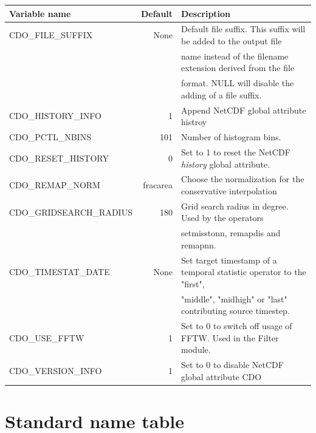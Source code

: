 \begin{tabular}[t]{|>{\columncolor{pcolor1}}l|r|l|}
\hline
\rowcolor{pcolor2}
\textbf{Variable name}           &  \textbf{Default} & \textbf{Description} \\ \hline
CDO\_FILE\_SUFFIX             &   None   &  Default file suffix. This suffix will be added to the output file \\
                                           &               &  name instead of the filename extension derived from the file \\
                                           &               & format. NULL will disable the adding of a file suffix. \\ \hline
CDO\_HISTORY\_INFO        &         1   & Append NetCDF global attribute histroy \\ \hline
CDO\_PCTL\_NBINS            &     101    & Number of histogram bins. \\ \hline
CDO\_RESET\_HISTORY       &         0  & Set to 1 to reset the NetCDF \textit{history} global attribute.\\ \hline
CDO\_REMAP\_NORM         &  fracarea & Choose the normalization for the conservative interpolation \\ \hline
CDO\_GRIDSEARCH\_RADIUS       &  180       & Grid search radius in degree. Used by the operators \\
                                                     &        & setmisstonn, remapdis and remapnn. \\ \hline
CDO\_TIMESTAT\_DATE     &  None   & Set target timestamp of a temporal statistic operator to the "first",  \\
                                           &             & "middle", "midhigh" or "last" contributing  source timestep.\\ \hline
CDO\_USE\_FFTW               &         1  & Set to 0 to switch off usage of FFTW. Used in the Filter module.\\ \hline
CDO\_VERSION\_INFO        &         1  & Set to 0 to disable NetCDF global attribute CDO \\ \hline
\end{tabular}





\chapter{\label{stdnametable}Standard name table}

